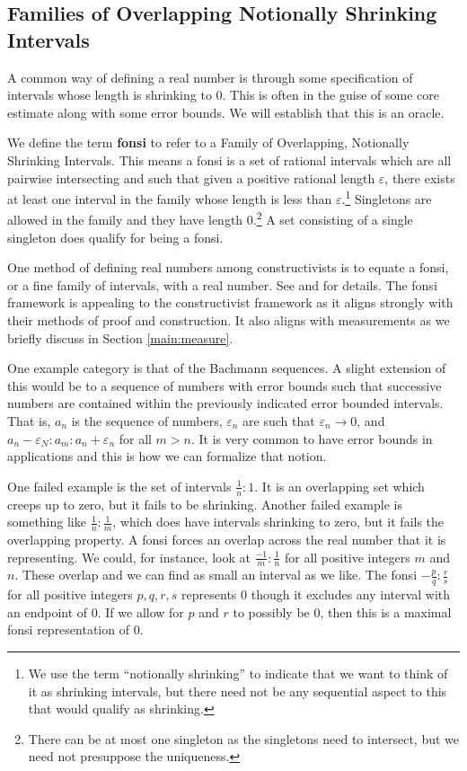 \documentclass[12pt]{article}
\begin{document}
\subsection{Families of Overlapping Notionally Shrinking Intervals}

A common way of defining a real number is through some specification of intervals whose length is shrinking to 0. This is often in the guise of some core estimate along with some error bounds. We will establish that this is an oracle. 

We define the term \textbf{fonsi} to refer to a Family of Overlapping, Notionally Shrinking Intervals. This means a fonsi is a set of rational intervals which are all pairwise intersecting and such that given a positive rational length $\varepsilon$, there exists at least one interval in the family whose length is less than $\varepsilon$.\footnote{We use the term ``notionally shrinking'' to indicate that we want to think of it as shrinking intervals, but there need not be any sequential aspect to this that would qualify as shrinking.} Singletons are allowed in the family and they have length 0.\footnote{There can be at most one singleton as the singletons need to intersect, but we need not presuppose the uniqueness.} A set consisting of a single singleton does qualify for being a fonsi.

One method of defining real numbers among constructivists is to equate a fonsi, or a fine family of intervals, with a real number. See \cite{bridger} and \cite{bridges} for details. The fonsi framework is appealing to the constructivist framework as it aligns strongly with their methods of proof and construction. It also aligns with measurements as we briefly discuss in Section \ref{main:measure}. 

One example category is that of the Bachmann sequences. A slight extension of this would be to a sequence of numbers with error bounds such that successive numbers are contained within the previously indicated error bounded intervals. That is, $a_n$ is the sequence of numbers, $\varepsilon_n$ are such that $\varepsilon_n \to 0$, and  $a_n-\varepsilon_N:a_m:a_n+\varepsilon_n$ for all $m > n$.  It is very common to have error bounds in applications and this is how we can formalize that notion. 

One failed example is the set of intervals $\frac{1}{n}:1$. It is an overlapping set which creeps up to zero, but it fails to be shrinking. Another failed example is something like $\frac{1}{n}:\frac{1}{m}$, which does have intervals shrinking to zero, but it fails the overlapping property. A fonsi forces an overlap across the real number that it is representing. We could, for instance, look at $\frac{-1}{m}:\frac{1}{n}$ for all positive integers $m$ and $n$. These overlap and we can find as small an interval as we like. The fonsi $-\frac{p}{q} : \frac{r}{s}$ for all positive integers $p, q, r, s$ represents $0$ though it excludes any interval with an endpoint of $0$. If we allow for $p$ and $r$ to possibly be 0, then this is a maximal fonsi representation of $0$. 
\end{document}
